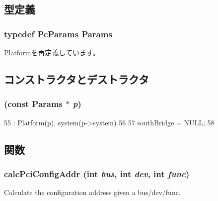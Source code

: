 \subsection{型定義}
\hypertarget{classPc_a3cb59bd5a1945e535ba84d5e34ad19ec}{
\subsubsection[{Params}]{\setlength{\rightskip}{0pt plus 5cm}typedef PcParams {\bf Params}}}
\label{classPc_a3cb59bd5a1945e535ba84d5e34ad19ec}


\hyperlink{classPlatform_af4e77eaf2602e4808deef7d1ba95e579}{Platform}を再定義しています。

\subsection{コンストラクタとデストラクタ}
\hypertarget{classPc_a6186230aeb24af2fdcdb2d7881df7403}{
\subsubsection[{Pc}]{ (const {\bf Params} $\ast$ {\em p})}}
\label{classPc_a6186230aeb24af2fdcdb2d7881df7403}



\begin{DoxyCode}
55     : Platform(p), system(p->system)
56 {
57     southBridge = NULL;
58 }
\end{DoxyCode}


\subsection{関数}
\hypertarget{classPc_a5b8797a83289cb5fd895c9a5dc7eae6f}{
\subsubsection[{calcPciConfigAddr}]{ calcPciConfigAddr (int {\em bus}, \/  int {\em dev}, \/  int {\em func})}}
\label{classPc_a5b8797a83289cb5fd895c9a5dc7eae6f}
Calculate the configuration address given a bus/dev/func. 

